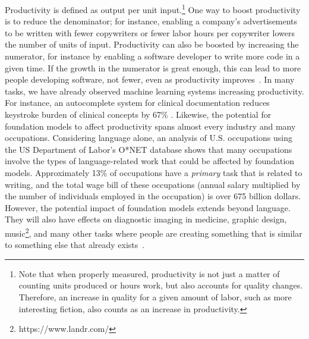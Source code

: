 Productivity is defined as output per unit input.\footnote{Note that when properly measured, productivity is not just a matter of counting units produced or hours work, but also accounts for quality changes. Therefore, an increase in quality for a given amount of labor, such as more interesting fiction, also counts as an increase in productivity.}
One way to boost productivity is to reduce the denominator; for instance, enabling a company's advertisements to be written with fewer copywriters or fewer labor hours per copywriter lowers the number of units of input. 
Productivity can also be boosted by increasing the numerator, for instance by enabling a software developer to write more code in a given time.
If the growth in the numerator is great enough, this can lead to more people developing software, not fewer, even as productivity improves~\citep{david2015there}.  
In many tasks, we have already observed machine learning systems increasing productivity. 
For instance, an autocomplete system for clinical documentation reduces keystroke burden of clinical concepts by 67\% \citep{pmlr-v126-gopinath20a}.
Likewise, the potential for foundation models to affect productivity spans almost every industry and many occupations. 
Considering language alone, an analysis of U.S. occupations using the US Department of Labor's O*NET database shows that many occupations involve the types of language-related work that could be affected by foundation models. 
Approximately 13\% of occupations have a \textit{primary} task that is related to writing, and the total wage bill of these occupations (annual salary multiplied by the number of individuals employed in the occupation) is over 675 billion dollars. 
However, the potential impact of foundation models extends beyond language. 
They will also have effects on diagnostic imaging in medicine, graphic design, music\footnote{https://www.landr.com/},
and many other tasks where people are creating something that is similar to something else that already exists~\citep{winkler2019derm,ramesh2021zeroshot}.

